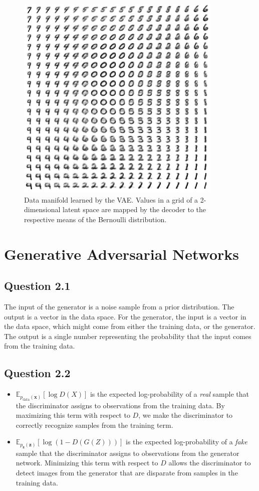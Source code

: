 \documentclass{article}
\begin{document}
\begin{figure}[t]
\centering
\includegraphics[scale=0.5]{img/manifold}
\caption{Data manifold learned by the VAE. Values in a grid of a 2-dimensional latent space are mapped by the decoder to the respective means of the Bernoulli distribution.}
\label{fig:manifold}
\end{figure}

\section{Generative Adversarial Networks}

\subsection*{Question 2.1}

The input of the generator is a noise sample from a prior distribution. The output is a vector in the data space. For the generator, the input is a vector in the data space, which might come from either the training data, or the generator. The output is a single number representing the probability that the input comes from the training data.

\subsection*{Question 2.2}

\begin{itemize}
\item $\mathbb{E}_{p_{\text{data}}(\mathbf{x})}[\log D(X)]$ is the expected log-probability of a \textit{real} sample that the discriminator assigns to observations from the training data. By maximizing this term with respect to $D$, we make the discriminator to correctly recognize samples from the training term.
\item $\mathbb{E}_{p_{\mathbf{z}}(\mathbf{z})}[\log (1-D(G(Z)))]$ is the expected log-probability of a \textit{fake} sample that the discriminator assigns to observations from the generator network. Minimizing this term with respect to $D$ allows the discriminator to detect images from the generator that are disparate from samples in the training data.
\end{itemize}
\end{document}
